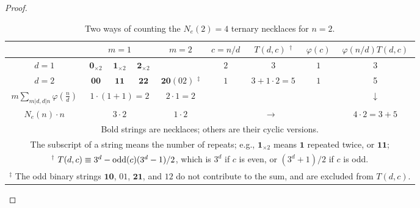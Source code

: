 \documentclass[twocolumn]{revtex4-1}
\begin{document}
\begin{proof}
\begin{table*}[t]\footnotesize
\caption{Two ways of counting the $N_e(2) = 4$ ternary necklaces for $n = 2$.
}
\begin{center}
\begin{tabularx}{\textwidth}{c | c  c c | c  | c | c | c | c }
\hline
        & \multicolumn{3}{c|}{$m = 1$}
        & $m = 2$
        & $c = n/d$
        & $T(d, c)$ $^\dagger$
        & $\varphi(c)$ & $\varphi(n/d) T(d, c)$\\
\hline
$d = 1$ & \hspace{1mm} $\mathbf{0}_{\times2}$ \hspace{1mm}
        & \hspace{1mm} $\mathbf{1}_{\times2}$ \hspace{1mm}
        & \hspace{1mm} $\mathbf{2}_{\times2}$ \hspace{1mm}
        & & $2$ & $3$ & $1$ & 3 \\
\hline
$d = 2$ & $\mathbf{00}$
        & $\mathbf{11}$
        & $\mathbf{22}$
        & \hspace{1mm} $\mathbf{20} (02)$ $^\ddagger$ \hspace{1mm}
        & $1$ & $3+1\cdot2=5$ & $1$ & 5 \\
\hline
$m \sum_{m|d, d|n} \varphi(\frac{n}{d})$
      & \multicolumn{3}{c|}{$1\cdot(1+1) = 2$}
      & $2\cdot1 = 2$ &    \multicolumn{3}{c|}{} &  $\downarrow$\\
\hline
$N_e(n)\cdot n$
    & \multicolumn{3}{c|}{$3 \cdot 2$} & $1 \cdot 2$ &
  \multicolumn{3}{c|}{$\rightarrow$} & $4\cdot2 = 3 + 5$ \\
\hline
\multicolumn{9}{p{\linewidth}}{
  Bold strings are necklaces; others are their cyclic versions.
}
\\
\multicolumn{9}{p{\linewidth}}{
The subscript of a string means the number of repeats;
e.g.,
$\mathbf{1}_{\times2}$ means $\mathbf{1}$ repeated twice, or $\mathbf{11}$;
}
\\
\multicolumn{9}{p{\linewidth}}{
$^\dagger$ $T(d, c) \equiv 3^d - \mathrm{odd}(c)(3^d-1)/2$,
which is $3^d$ if $c$ is even,
or $(3^d+1)/2$ if $c$ is odd.
}
\\
\multicolumn{9}{p{\linewidth}}{
$^\ddagger$
The odd binary strings $\mathbf{10}$, $01$, $\mathbf{21}$, and $12$
  do not contribute to the sum, and are excluded from $T(d, c)$.
}
\\
\hline
\end{tabularx}
\end{center}
\label{tab:countcubnecklace}
\end{table*}






\end{proof}
\end{document}
